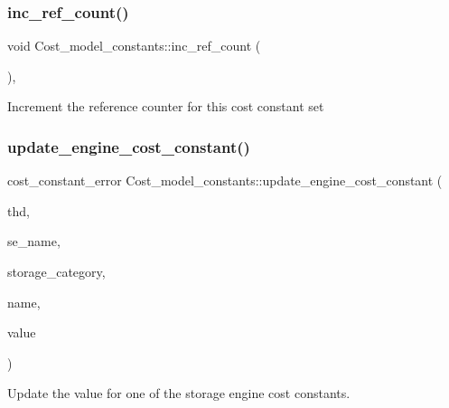\subsubsection{\texorpdfstring{inc\+\_\+ref\+\_\+count()}{inc\_ref\_count()}}
{\footnotesize\ttfamily void Cost\+\_\+model\+\_\+constants\+::inc\+\_\+ref\+\_\+count (\begin{DoxyParamCaption}{ }\end{DoxyParamCaption})\hspace{0.3cm}{\ttfamily [inline]}, {\ttfamily [protected]}}

Increment the reference counter for this cost constant set \mbox{\label{classCost__model__constants_aefa91f35a05d4254c67d63982924918e}} 
\subsubsection{\texorpdfstring{update\+\_\+engine\+\_\+cost\+\_\+constant()}{update\_engine\_cost\_constant()}}
{\footnotesize\ttfamily cost\+\_\+constant\+\_\+error Cost\+\_\+model\+\_\+constants\+::update\+\_\+engine\+\_\+cost\+\_\+constant (\begin{DoxyParamCaption}\item[{T\+HD $\ast$}]{thd,  }\item[{const L\+E\+X\+\_\+\+C\+S\+T\+R\+I\+NG \&}]{se\+\_\+name,  }\item[{uint}]{storage\+\_\+category,  }\item[{const L\+E\+X\+\_\+\+C\+S\+T\+R\+I\+NG \&}]{name,  }\item[{double}]{value }\end{DoxyParamCaption})}

Update the value for one of the storage engine cost constants.


